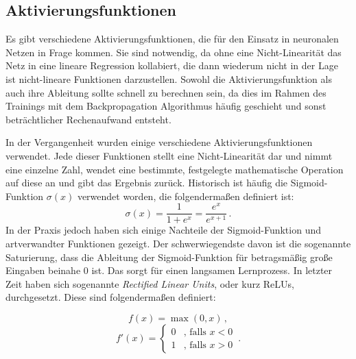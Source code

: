 \subsection{Aktivierungsfunktionen}
\label{sec:activationfuncs}
Es gibt verschiedene Aktivierungsfunktionen, die für den Einsatz in neuronalen Netzen in Frage kommen.
Sie sind notwendig, da ohne eine Nicht-Linearität das Netz in eine lineare Regression kollabiert, 
die dann wiederum nicht in der Lage ist nicht-lineare Funktionen darzustellen.
Sowohl die Aktivierungsfunktion als auch ihre Ableitung sollte schnell zu berechnen sein, 
da dies im Rahmen des Trainings mit dem Backpropagation Algorithmus häufig geschieht 
und sonst beträchtlicher Rechenaufwand entsteht.

In der Vergangenheit wurden einige verschiedene Aktivierungsfunktionen verwendet.
Jede dieser Funktionen stellt eine Nicht-Linearität dar und nimmt eine einzelne Zahl, wendet eine bestimmte, festgelegte mathematische 
Operation auf diese an und gibt das Ergebnis zurück.
Historisch ist häufig die Sigmoid-Funktion \(\sigma(x)\) verwendet worden, die folgendermaßen definiert ist:
\begin{equation}
	\sigma(x) = \frac{1}{1 + e^x} = \frac{e^x}{e^{x + 1}} \, .
	\label{func:Sigmoid}
\end{equation}
In der Praxis jedoch haben sich einige Nachteile der Sigmoid-Funktion und artverwandter Funktionen  gezeigt.
Der schwerwiegendste davon ist die sogenannte Saturierung,
dass die Ableitung der Sigmoid-Funktion für betragsmäßig große Eingaben beinahe \(0\) ist.
Das sorgt für einen langsamen Lernprozess.
In letzter Zeit haben sich sogenannte \textit{Rectified Linear Units}, oder kurz ReLUs, durchgesetzt.
Diese sind folgendermaßen definiert:
% 
	
	
\begin{equation}
	f(x) = \max(0, x) \, ,
\end{equation}
\begin{equation*}
	f'(x) = \begin{cases}
	0 &\text{, falls $x < 0$}\\
	1 &\text{, falls $x > 0$}
	\end{cases} \, .
\end{equation*}

